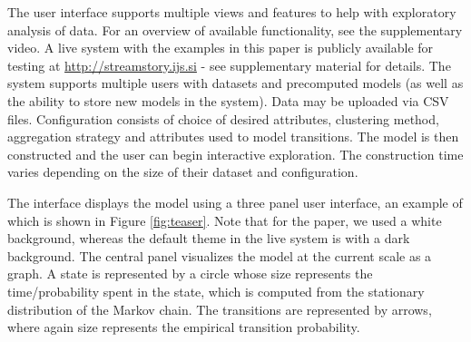 

The user interface supports multiple views and features to help with exploratory analysis of data. For an overview of available functionality, see the supplementary video. A live system with the examples in this paper is publicly available for testing at \url{http://streamstory.ijs.si} - see supplementary material for details. 
The system supports multiple users with datasets and precomputed models (as well as the ability to store new models in the system). Data may be uploaded via CSV files.  Configuration consists of choice of desired attributes,  clustering method, aggregation strategy and attributes used to model transitions. The model is then constructed and the user can begin interactive exploration. The construction time varies depending on the size of 
their dataset and configuration. %

The interface displays the model using a three panel user interface, an example of
which is shown in Figure \ref{fig:teaser}. Note that for the paper, we used a white background, whereas the default theme in the live system is with a dark background. The central panel visualizes the model at the current scale as a graph. A state is represented by a circle  whose size represents the time/probability spent in the state, which is computed from the stationary distribution of the Markov chain. The transitions are represented by arrows, where again size represents the empirical transition probability. 

